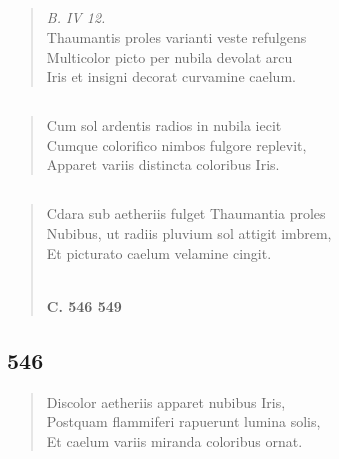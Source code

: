 \documentclass[11pt, a4paper]{report}
\begin{document}
            \subsection*{}
      \begin{verse}
      \textit{B. IV 12.} \\ Thaumantis proles varianti veste refulgens \\ Multicolor picto per nubila devolat arcu \\ Iris et insigni decorat curvamine caelum. \\ 
      \end{verse}
  
            \subsection*{}
      \begin{verse}
      Cum sol ardentis radios in nubila iecit \\ Cumque colorifico nimbos fulgore replevit, \\ Apparet variis distincta coloribus Iris. \\ 
      \end{verse}
  
            \subsection*{}
      \begin{verse}
      Cdara sub aetheriis fulget Thaumantia proles \\ Nubibus, ut radiis pluvium sol attigit imbrem, \\ Et picturato caelum velamine cingit. \\ 
        ﻿\pagebreak 
     \marginpar{[70]} \begin{center} \textbf{C. 546 549} \end{center}
      \end{verse}
  
            \subsection*{546}
      \begin{verse}
      Discolor aetheriis apparet nubibus Iris, \\ Postquam flammiferi rapuerunt lumina solis, \\ Et caelum variis miranda coloribus ornat. \\ 
      \end{verse}
  
\end{document}
